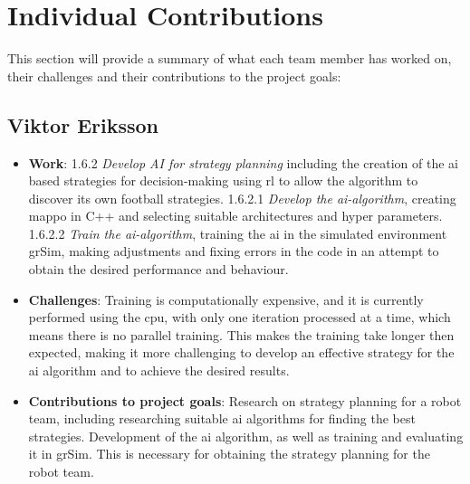 \section{Individual Contributions}


This section will provide a summary of what each team member has worked on, their challenges and their contributions to the project goals:
\subsection*{Viktor Eriksson}
\begin{itemize}
    \item \textbf{Work}: 1.6.2 \textit{Develop AI for strategy planning} including the creation of the \ac{ai} based strategies for decision-making using \ac{rl} to allow the algorithm to discover its own football strategies. 1.6.2.1  \textit{Develop the \acs{ai}-algorithm}, creating \ac{mappo} in C++ and selecting suitable architectures and hyper parameters. 1.6.2.2 \textit{Train the \acs{ai}-algorithm}, training the \ac{ai} in the simulated environment grSim, making adjustments and fixing errors in the code in an attempt to obtain the desired performance and behaviour.

    \item \textbf{Challenges}: Training is computationally expensive, and it is currently performed using the \ac{cpu}, with only one iteration processed at a time, which means there is no parallel training. This makes the training take longer then expected, making it more challenging to develop an effective strategy for the \ac{ai} algorithm and to achieve the desired results. 
    \item \textbf{Contributions to project goals}: Research on strategy planning for a robot team, including researching suitable \ac{ai} algorithms for finding the best strategies. Development of the \ac{ai} algorithm, as well as training and evaluating it in grSim. This is necessary for obtaining the strategy planning for the robot team.
\end{itemize}
